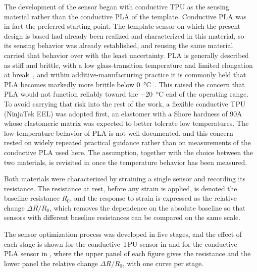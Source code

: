 The development of the sensor began with conductive TPU as the sensing material rather than the conductive PLA of the template. Conductive PLA was in fact the preferred starting point. The template sensor on which the present design is based had already been realized and characterized in this material, so its sensing behavior was already established, and reusing the same material carried that behavior over with the least uncertainty. PLA is generally described as stiff and brittle, with a low glass-transition temperature and limited elongation at break~\cite{Farah2016,protopasta_conductive_pla}, and within additive-manufacturing practice it is commonly held that PLA becomes markedly more brittle below \SI{0}{\celsius}~\cite{PLAlowtemp}. This raised the concern that PLA would not function reliably toward the \SI{-20}{\celsius} end of the operating range. To avoid carrying that risk into the rest of the work, a flexible conductive TPU (NinjaTek EEL) was adopted first, an elastomer with a Shore hardness of 90A~\cite{ninjatek_ninjaflex_2026} whose elastomeric matrix was expected to better tolerate low temperatures. The low-temperature behavior of PLA is not well documented, and this concern rested on widely repeated practical guidance rather than on measurements of the conductive PLA used here. The assumption, together with the choice between the two materials, is revisited in  once the temperature behavior has been measured.

Both materials were characterized by straining a single sensor and recording its resistance. The resistance at rest, before any strain is applied, is denoted the baseline resistance $R_0$, and the response to strain is expressed as the relative change $\Delta R / R_0$, which removes the dependence on the absolute baseline so that sensors with different baseline resistances can be compared on the same scale.

The sensor optimization process was developed in five stages, and the effect of each stage is shown for the conductive-TPU sensor in  and for the conductive-PLA sensor in , where the upper panel of each figure gives the resistance and the lower panel the relative change $\Delta R / R_0$, with one curve per stage.

